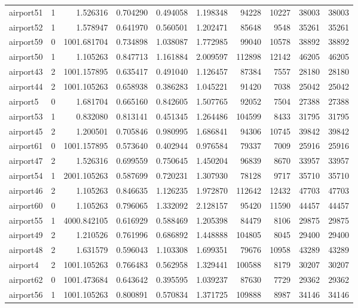 \begin{longtable}{|l|r|r|r|r|r|r|r|r|r|}
airport51 & 1 & 1.526316 & 0.704290 & 0.494058 & 1.198348 & 94228 & 10227 & 38003 & 38003 \\
airport52 & 1 & 1.578947 & 0.641970 & 0.560501 & 1.202471 & 85648 & 9548 & 35261 & 35261 \\
airport59 & 0 & 1001.681704 & 0.734898 & 1.038087 & 1.772985 & 99040 & 10578 & 38892 & 38892 \\
airport50 & 1 & 1.105263 & 0.847713 & 1.161884 & 2.009597 & 112898 & 12142 & 46205 & 46205 \\
airport43 & 2 & 1001.157895 & 0.635417 & 0.491040 & 1.126457 & 87384 & 7557 & 28180 & 28180 \\
airport44 & 2 & 1001.105263 & 0.658938 & 0.386283 & 1.045221 & 91420 & 7038 & 25042 & 25042 \\
airport5 & 0 & 1.681704 & 0.665160 & 0.842605 & 1.507765 & 92052 & 7504 & 27388 & 27388 \\
airport53 & 1 & 0.832080 & 0.813141 & 0.451345 & 1.264486 & 104599 & 8433 & 31795 & 31795 \\
airport45 & 2 & 1.200501 & 0.705846 & 0.980995 & 1.686841 & 94306 & 10745 & 39842 & 39842 \\
airport61 & 0 & 1001.157895 & 0.573640 & 0.402944 & 0.976584 & 79337 & 7009 & 25916 & 25916 \\
airport47 & 2 & 1.526316 & 0.699559 & 0.750645 & 1.450204 & 96839 & 8670 & 33957 & 33957 \\
airport54 & 1 & 2001.105263 & 0.587699 & 0.720231 & 1.307930 & 78128 & 9717 & 35710 & 35710 \\
airport46 & 2 & 1.105263 & 0.846635 & 1.126235 & 1.972870 & 112642 & 12432 & 47703 & 47703 \\
airport60 & 0 & 1.105263 & 0.796065 & 1.332092 & 2.128157 & 95420 & 11590 & 44457 & 44457 \\
airport55 & 1 & 4000.842105 & 0.616929 & 0.588469 & 1.205398 & 84479 & 8106 & 29875 & 29875 \\
airport49 & 2 & 1.210526 & 0.761996 & 0.686892 & 1.448888 & 104805 & 8045 & 29400 & 29400 \\
airport48 & 2 & 1.631579 & 0.596043 & 1.103308 & 1.699351 & 79676 & 10958 & 43289 & 43289 \\
airport4 & 2 & 1001.105263 & 0.766483 & 0.562958 & 1.329441 & 100588 & 8179 & 30207 & 30207 \\
airport62 & 0 & 1001.473684 & 0.643642 & 0.395595 & 1.039237 & 87630 & 7729 & 29362 & 29362 \\
airport56 & 1 & 1001.105263 & 0.800891 & 0.570834 & 1.371725 & 109888 & 8987 & 34146 & 34146 \\

\end{longtable}
